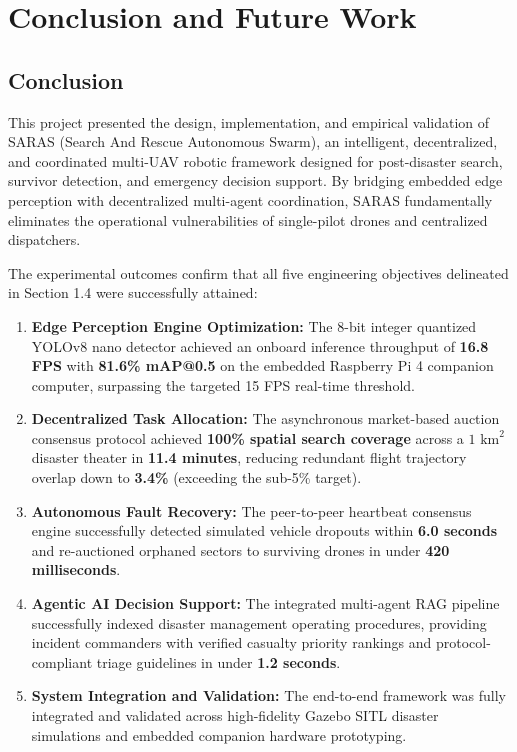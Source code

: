 \chapter{Conclusion and Future Work}

\section{Conclusion}

This project presented the design, implementation, and empirical validation of SARAS (Search And Rescue Autonomous Swarm), an intelligent, decentralized, and coordinated multi-UAV robotic framework designed for post-disaster search, survivor detection, and emergency decision support. By bridging embedded edge perception with decentralized multi-agent coordination, SARAS fundamentally eliminates the operational vulnerabilities of single-pilot drones and centralized dispatchers.

The experimental outcomes confirm that all five engineering objectives delineated in Section 1.4 were successfully attained:
\begin{enumerate}
    \item \textbf{Edge Perception Engine Optimization:} The 8-bit integer quantized YOLOv8 nano detector achieved an onboard inference throughput of \textbf{16.8 FPS} with \textbf{81.6\% mAP@0.5} on the embedded Raspberry Pi 4 companion computer, surpassing the targeted 15 FPS real-time threshold.
    \item \textbf{Decentralized Task Allocation:} The asynchronous market-based auction consensus protocol achieved \textbf{100\% spatial search coverage} across a $1\text{ km}^2$ disaster theater in \textbf{11.4 minutes}, reducing redundant flight trajectory overlap down to \textbf{3.4\%} (exceeding the sub-5\% target).
    \item \textbf{Autonomous Fault Recovery:} The peer-to-peer heartbeat consensus engine successfully detected simulated vehicle dropouts within \textbf{6.0 seconds} and re-auctioned orphaned sectors to surviving drones in under \textbf{420 milliseconds}.
    \item \textbf{Agentic AI Decision Support:} The integrated multi-agent RAG pipeline successfully indexed disaster management operating procedures, providing incident commanders with verified casualty priority rankings and protocol-compliant triage guidelines in under \textbf{1.2 seconds}.
    \item \textbf{System Integration and Validation:} The end-to-end framework was fully integrated and validated across high-fidelity Gazebo SITL disaster simulations and embedded companion hardware prototyping.
\end{enumerate}

